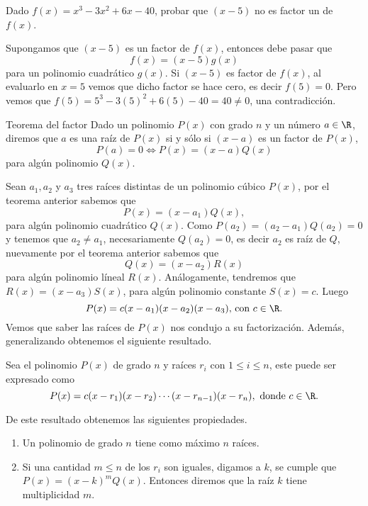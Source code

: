\begin{example}
    Dado $f(x) = x^3 - 3x^2 + 6x - 40$, probar que $(x - 5)$ no es factor un de $f(x)$.
\end{example}
\begin{solution}
    Supongamos que $(x - 5)$ es un factor de $f(x)$, entonces debe pasar que
    \[
        f(x) = (x - 5)g(x)
    \]
    para un polinomio cuadrático $g(x)$.
    Si $(x - 5)$ es factor de $f(x)$, al evaluarlo en $x = 5$ vemos que dicho factor se hace cero, es decir $f(5) = 0$.
    Pero vemos que $f(5) = 5^3 - 3(5)^2 + 6(5) - 40 = 40 \neq 0$, una contradicción.
\end{solution}

\begin{theorem.tcb}{Teorema del factor}{}\label{factor-theorem}
Dado un polinomio $P(x)$ con grado $n$ y un número $a \in \R$, diremos que $a$ es una raíz de $P(x)$ si y sólo si $(x - a)$ es un factor de $P(x)$, \ie
\[
    P(a) = 0 \iff P(x) = (x - a)Q(x)
\]
para algún polinomio $Q(x)$.
\end{theorem.tcb}

Sean $a_1, a_2$ y $a_3$ tres raíces distintas de un polinomio cúbico $P(x)$, por el teorema anterior sabemos que
\[
    P(x) = (x - a_1)Q(x),
\]
para algún polinomio cuadrático $Q(x)$.
Como $P(a_2) = (a_2 - a_1)Q(a_2) = 0$ y tenemos que $a_2 \neq a_1$, necesariamente $Q(a_2) = 0$, es decir $a_2$ es raíz de $Q$, nuevamente por el teorema anterior sabemos que
\[
    Q(x) = (x - a_2)R(x)
\]
para algún polinomio líneal $R(x)$.
Análogamente, tendremos que $R(x) = (x - a_3)S(x)$, para algún polinomio constante $S(x) = c$.
Luego
\[
    P(x) = c(x - a_1)(x - a_2)(x - a_3) \mbox{, con } c \in \R.
\]
Vemos que saber las raíces de $P(x)$ nos condujo a su factorización.
Además, generalizando obtenemos el siguiente resultado.
\begin{remark.tcb}
    Sea el polinomio $P(x)$ de grado $n$ y raíces $r_i$ con $1 \leq i \leq n$, este puede ser expresado como
    \begin{equation}
        P(x) = c(x - r_1)(x - r_2)\cdots(x - r_{n-1})(x - r_n), \ \text{donde}\ c \in \R.
    \end{equation}
\end{remark.tcb}
De este resultado obtenemos las siguientes propiedades.
\begin{enumerate}
    \item Un polinomio de grado $n$ tiene como máximo $n$ raíces.
    \item Si una cantidad $m \leq n$ de los $r_i$ son iguales, digamos a $k$, se cumple que $P(x) = (x - k)^m Q(x)$.
    Entonces diremos que la raíz $k$ tiene multiplicidad $m$.
\end{enumerate}

